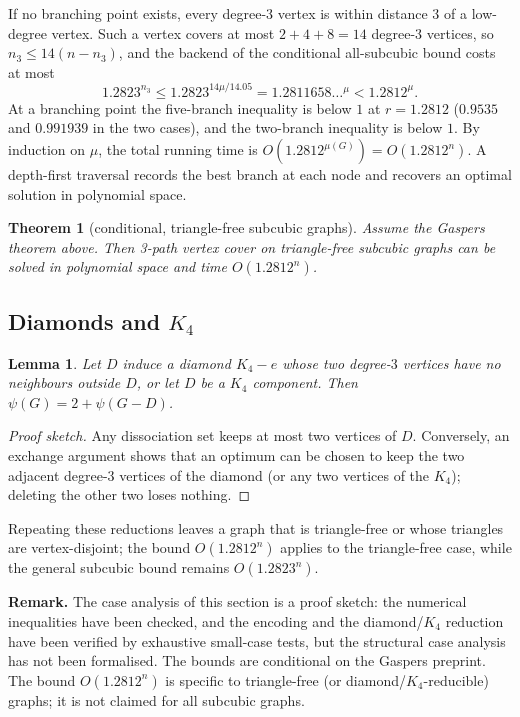 \documentclass[11pt]{article}
\newtheorem{lemma}{Lemma}
\newtheorem*{theorem*}{Theorem}
\begin{document}
If no branching point exists, every degree-\(3\) vertex is within distance \(3\) of a
low-degree vertex. Such a vertex covers at most \(2+4+8=14\) degree-\(3\) vertices, so
\(n_3\le14(n-n_3)\), and the backend of the conditional all-subcubic bound costs at
most
\[
  1.2823^{n_3}\le1.2823^{14\mu/14.05}
  =1.2811658\ldots^{\mu}<1.2812^{\mu}.
\]
At a branching point the five-branch inequality is below \(1\) at \(r=1.2812\)
(\(0.9535\) and \(0.991939\) in the two cases), and the two-branch inequality is
below \(1\). By induction on \(\mu\), the total running time is
\(O(1.2812^{\mu(G)})=O(1.2812^n)\). A depth-first traversal records the best branch
at each node and recovers an optimal solution in polynomial space.

\begin{theorem*}[conditional, triangle-free subcubic graphs]
Assume the Gaspers theorem above. Then 3-path vertex cover on triangle-free subcubic
graphs can be solved in polynomial space and time \(O(1.2812^n)\).
\end{theorem*}

\subsection*{Diamonds and \(K_4\)}

\begin{lemma}
Let \(D\) induce a diamond \(K_4-e\) whose two degree-\(3\) vertices have no
neighbours outside \(D\), or let \(D\) be a \(K_4\) component. Then
\(\psi(G)=2+\psi(G-D)\).
\end{lemma}

\begin{proof}[Proof sketch]
Any dissociation set keeps at most two vertices of \(D\). Conversely, an exchange
argument shows that an optimum can be chosen to keep the two adjacent degree-\(3\)
vertices of the diamond (or any two vertices of the \(K_4\)); deleting the other two
loses nothing.
\end{proof}

Repeating these reductions leaves a graph that is triangle-free or whose triangles
are vertex-disjoint; the bound \(O(1.2812^n)\) applies to the triangle-free case,
while the general subcubic bound remains \(O(1.2823^n)\).

\smallskip
\noindent\textbf{Remark.}
The case analysis of this section is a proof sketch: the numerical inequalities have
been checked, and the encoding and the diamond/\(K_4\) reduction have been verified by
exhaustive small-case tests, but the structural case analysis has not been
formalised. The bounds are conditional on the Gaspers preprint. The bound
\(O(1.2812^n)\) is specific to triangle-free (or diamond/\(K_4\)-reducible) graphs; it
is not claimed for all subcubic graphs.
\end{document}
